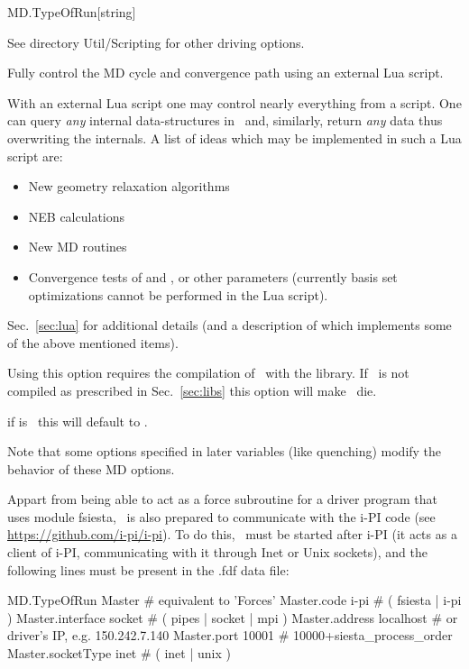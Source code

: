 \begin{fdfentry}{MD.TypeOfRun}[string]
\begin{fdfoptions}
    See directory Util/Scripting  for other driving
    options.

    \option[Lua]%
    Fully control the MD cycle and convergence path using an external
    Lua script. 

    With an external Lua script one may control nearly everything from
    a script. One can query \emph{any} internal data-structures in
    \siesta\ and, similarly, return \emph{any} data thus overwriting
    the internals. A list of ideas which may be implemented in such a
    Lua script are:
    \begin{itemize}
      \item New geometry relaxation algorithms

      \item NEB calculations

      \item New MD routines

      \item Convergence tests of  and
      , or other parameters (currently basis
      set optimizations cannot be performed in the Lua script).

    \end{itemize}
    Sec.~\ref{sec:lua} for additional details (and a description of
     which implements some of the above mentioned items).

    Using this option requires the compilation of \siesta\ with the
     library.%
    If \siesta\ is not compiled as prescribed in Sec.~\ref{sec:libs}
    this option will make \siesta\ die.

  \end{fdfoptions}

  \note if  is \fdftrue\ this will default
  to .

  Note that some options specified in later variables (like quenching)
  modify the behavior of these MD options.

  Appart from being able to act as a force subroutine for a driver
  program that uses module fsiesta, \siesta\ is also prepared to
  communicate with the i-PI code (see
  \url{https://github.com/i-pi/i-pi}).
  To do this, \siesta\ must be started after i-PI (it acts as a client
  of i-PI, communicating with it through Inet or Unix sockets), and
  the following lines must be present in the .fdf data file:
  \begin{fdfexample}
     MD.TypeOfRun      Master     # equivalent to 'Forces'
     Master.code       i-pi       # ( fsiesta | i-pi )
     Master.interface  socket     # ( pipes | socket | mpi )
     Master.address    localhost  # or driver's IP, e.g. 150.242.7.140
     Master.port       10001      # 10000+siesta_process_order
     Master.socketType inet       # ( inet | unix )
  \end{fdfexample}

\end{fdfentry}



